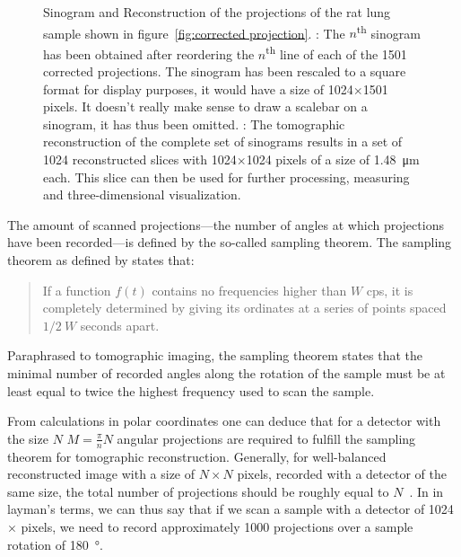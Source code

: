 \begin{figure}[h]
{%
		\label{subfig:rec}%
		}%
	\caption[Sinogram and Reconstruction]{Sinogram and Reconstruction of the projections of the rat lung sample shown in figure~\ref{fig:corrected projection}. : The $n$\textsuperscript{th} sinogram has been obtained after reordering the $n$\textsuperscript{th} line of each of the 1501 corrected projections. The sinogram has been rescaled to a square format for display purposes, it would have a size of 1024$\times$1501 pixels. It doesn't really make sense to draw a scalebar on a sinogram, it has thus been omitted. : The tomographic reconstruction of the complete set of sinograms results in a set of 1024 reconstructed slices with 1024$\times$1024 pixels of a size of \SI{1.48}{\micro\meter} each. This slice can then be used for further processing, measuring and three-dimensional visualization.}
	\label{fig:Sin Rec}
\end{figure}

The amount of scanned projections---the number of angles at which projections have been recorded---is defined by the so-called sampling theorem. The sampling theorem as defined by \citet{Shannon1949} states that: \begin{quote}If a function $f(t)$ contains no frequencies higher than $W$ cps, it is completely determined by giving its ordinates at a series of points spaced $1/2\ W$ seconds apart. \cite{Shannon1949}\end{quote}

Paraphrased to tomographic imaging, the sampling theorem states that the minimal number of recorded angles along the rotation of the sample must be at least equal to twice the highest frequency used to scan the sample.

From calculations in polar coordinates one can deduce that for a detector with the size $N$ $M=\frac{\pi}{n}N$ angular projections are required to fulfill the sampling theorem for tomographic reconstruction. Generally, for well-balanced reconstructed image with a size of $N\times N$ pixels, recorded with a detector of the same size, the total number of projections should be roughly equal to $N$~\cite{Kak2002}. In in layman's terms, we can thus say that if we scan a sample with a detector of 1024$\times$ pixels, we need to record approximately 1000 projections over a sample rotation of \SI{180}{\degree}.

